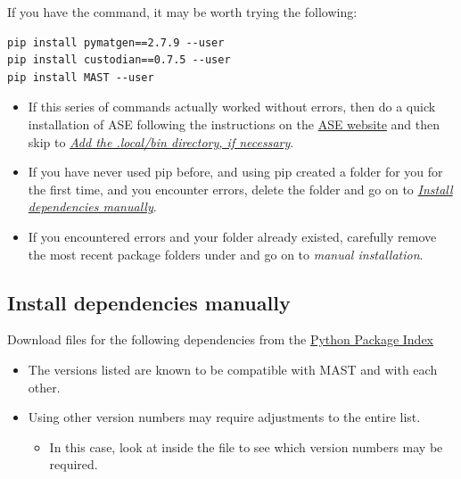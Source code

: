 \documentclass[letterpaper,10pt,english]{sphinxmanual}
\begin{document}
If you have the  command, it may be worth trying the following:

\begin{Verbatim}[commandchars=\\\{\}]
pip install pymatgen==2.7.9 --user
pip install custodian==0.7.5 --user
pip install MAST --user
\end{Verbatim}
\begin{itemize}
\item {} 
If this series of commands actually worked without errors, then do a quick installation of ASE following the instructions on the \href{https://wiki.fysik.dtu.dk/ase/download.html}{ASE website} and then skip to {\hyperref[1_0_installation:add-local-bin]{\emph{Add the .local/bin directory, if necessary}}}.

\item {} 
If you have never used pip before, and using pip created a  folder for you for the first time, and you encounter errors, delete the  folder and go on to {\hyperref[1_0_installation:manual-installation]{\emph{Install dependencies manually}}}.

\item {} 
If you encountered errors and your  folder already existed, carefully remove the most recent package folders under  and go on to \emph{manual installation}.

\end{itemize}


\subsection{Install dependencies manually}
\label{1_0_installation:manual-installation}\label{1_0_installation:install-dependencies-manually}
Download  files for the following dependencies from the \href{https://pypi.python.org}{Python Package Index}
\begin{itemize}
\item {} 
The versions listed are known to be compatible with MAST and with each other.

\item {} 
Using other version numbers may require adjustments to the entire list.
\begin{itemize}
\item {} 
In this case, look at  inside the  file to see which version numbers may be required.

\end{itemize}

\end{itemize}
\end{document}
